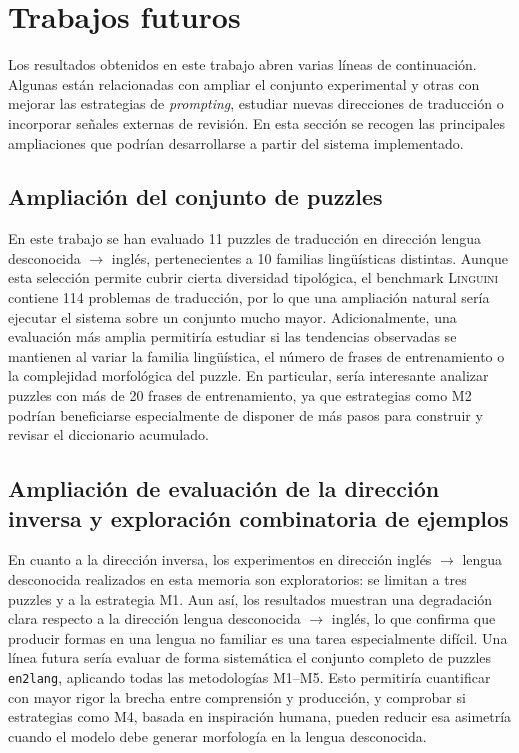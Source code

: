 \chapter{Trabajos futuros}
\label{cap:trabajos_futuros}

Los resultados obtenidos en este trabajo abren varias líneas de continuación. Algunas están relacionadas con ampliar el conjunto experimental y otras con mejorar las estrategias de \textit{prompting}, estudiar nuevas direcciones de traducción o incorporar señales externas de revisión. En esta sección se recogen las principales ampliaciones que podrían desarrollarse a partir del sistema implementado.

\section{Ampliación del conjunto de puzzles}
\label{sec:futuro_puzzles}

En este trabajo se han evaluado 11 puzzles de traducción en dirección lengua desconocida $\rightarrow$ inglés, pertenecientes a 10 familias lingüísticas distintas. Aunque esta selección permite cubrir cierta diversidad tipológica, el benchmark \textsc{Linguini} contiene 114 problemas de traducción, por lo que una ampliación natural sería ejecutar el sistema sobre un conjunto mucho mayor. Adicionalmente, una evaluación más amplia permitiría estudiar si las tendencias observadas se mantienen al variar la familia lingüística, el número de frases de entrenamiento o la complejidad morfológica del puzzle. En particular, sería interesante analizar puzzles con más de 20 frases de entrenamiento, ya que estrategias como M2 podrían beneficiarse especialmente de disponer de más pasos para construir y revisar el diccionario acumulado.

\section{Ampliación de evaluación de la dirección inversa y exploración combinatoria de ejemplos}
\label{sec:futuro_inversa}

En cuanto a la dirección inversa, los experimentos en dirección inglés $\rightarrow$ lengua desconocida realizados en esta memoria son exploratorios: se limitan a tres puzzles y a la estrategia M1. Aun así, los resultados muestran una degradación clara respecto a la dirección lengua desconocida $\rightarrow$ inglés, lo que confirma que producir formas en una lengua no familiar es una tarea especialmente difícil. Una línea futura sería evaluar de forma sistemática el conjunto completo de puzzles \texttt{en2lang}, aplicando todas las metodologías M1--M5. Esto permitiría cuantificar con mayor rigor la brecha entre comprensión y producción, y comprobar si estrategias como M4, basada en inspiración humana, pueden reducir esa asimetría cuando el modelo debe generar morfología en la lengua desconocida.

